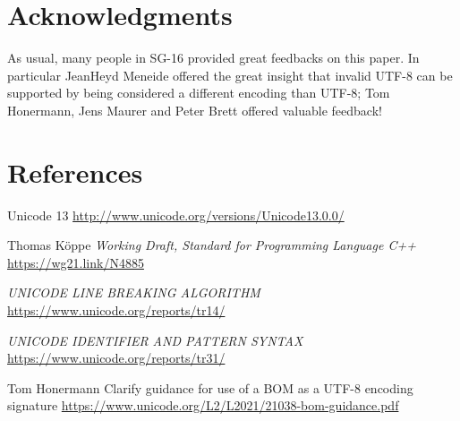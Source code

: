 \documentclass{wg21}
\begin{document}
\section{Acknowledgments}

As usual, many people in SG-16 provided great feedbacks on this paper.
In particular JeanHeyd Meneide offered the great insight that invalid UTF-8 can be supported by being considered a different encoding than UTF-8; Tom Honermann, Jens Maurer and Peter Brett offered valuable feedback!


\section{References}
\renewcommand{\section}[2]{}%



\begin{thebibliography}{9}


Unicode 13\newline
\url{http://www.unicode.org/versions/Unicode13.0.0/}

Thomas Köppe
\emph{Working Draft, Standard for Programming Language C++}\newline
\url{https://wg21.link/N4885}

\emph{UNICODE LINE BREAKING ALGORITHM}\newline
\url{https://www.unicode.org/reports/tr14/}

\emph{UNICODE IDENTIFIER AND PATTERN SYNTAX}\newline
\url{https://www.unicode.org/reports/tr31/}

Tom Honermann
Clarify guidance for use of a BOM as a UTF-8 encoding signature
\url{https://www.unicode.org/L2/L2021/21038-bom-guidance.pdf}
    

\end{thebibliography}
\end{document}
